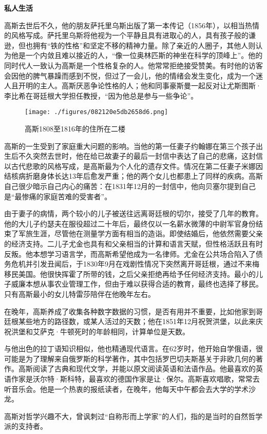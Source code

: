 \textbf{私人生活}  

高斯去世后不久，他的朋友萨托里乌斯出版了第一本传记（1856年），以相当热情的风格写成。萨托里乌斯将他视为一个平静且具有进取心的人，具有孩子般的谦逊，但也拥有“铁的性格”和坚定不移的精神力量。除了亲近的人圈子，其他人则认为他是一个内敛且难以接近的人，“像一位奥林匹斯的神坐在科学的顶峰上”。他的同时代人一致认为高斯是一个性格复杂的人。他常常拒绝接受赞美。有时他的访客会因他的脾气暴躁而感到不悦，但过了一会儿，他的情绪会发生变化，成为一个迷人且开明的主人。高斯厌恶争论性格的人；他和同事豪斯曼一起反对让尤斯图斯·李比希在哥廷根大学担任教授，“因为他总是参与一些争论”。
\begin{figure}[ht]
\centering
\texttt{[image: ./figures/082120e5db2658d6.png]}
\caption{高斯1808至1816年的住所在二楼} \label{fig_KRGS_12}
\end{figure}
高斯的一生受到了家庭重大问题的影响。当他的第一任妻子约翰娜在第三个孩子出生后不久突然去世时，他在给已故妻子的最后一封信中表达了自己的悲痛，这封信以古代悲歌的风格写成，是高斯最为个人化的遗存文件。情况在第二任妻子米娜因结核病折磨身体长达13年后愈发严重；他的两个女儿也都患上了同样的疾病。高斯自己很少暗示自己内心的痛苦：在1831年12月的一封信中，他向贝塞尔提到自己是“最惨痛的家庭苦难的受害者”。

由于妻子的病情，两个较小的儿子被送往远离哥廷根的切尔，接受了几年的教育。他的大儿子约瑟夫在服役超过二十年后，最终仅以一名薪水微薄的中尉军官身份结束了军旅生涯，尽管他在测量学方面有相当的造诣。即使结婚后，他依然需要父亲的经济支持。二儿子尤金也具有和父亲相当的计算和语言天赋，但性格活跃且有时反叛。他本想学习语言学，而高斯希望他成为一名律师。尤金在公共场合陷入了债务危机并引发丑闻后，于1830年9月在戏剧性情况下突然离开哥廷根，通过不来梅移民美国。他很快挥霍了所带的钱，之后父亲拒绝再给予任何经济支持。最小的儿子威廉本想从事农业管理工作，但由于难以获得合适的教育，最终也选择了移民。只有高斯最小的女儿特雷莎陪伴在他晚年左右。

在晚年，高斯养成了收集各种数字数据的习惯，是否有用并不重要，比如他家到哥廷根某些地方的路径数，或某人活过的天数；他在1851年12月祝贺洪堡，以此来庆祝洪堡和艾萨克·牛顿死时的年龄相同，计算单位是天数。

与他出色的拉丁语知识相似，他也精通现代语言。在62岁时，他开始自学俄语，很可能是为了理解来自俄罗斯的科学著作，其中包括罗巴切夫斯基关于非欧几何的著作。高斯阅读了古典和现代文学，并能以原文阅读英语和法语作品。他最喜欢的英语作家是沃尔特·斯科特，最喜欢的德国作家是让·保尔。高斯喜欢唱歌，常常去听音乐会。他是一个热衷的报纸读者，在晚年，他每天中午都会去大学的学术沙龙。

高斯对哲学兴趣不大，曾讽刺过“自称形而上学家”的人们，指的是当时的自然哲学派的支持者。

